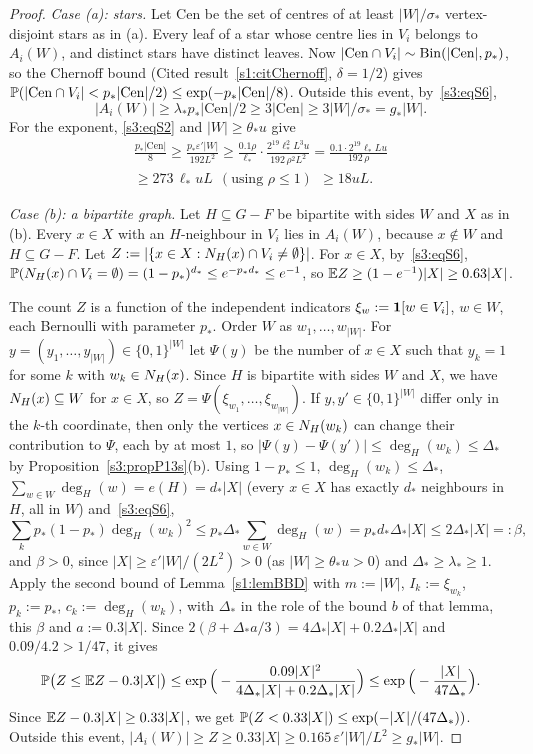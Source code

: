 \begin{proof}
\emph{Case (a): stars.} Let $\mathrm{Cen}$ be the set of centres of at
least $|W|/\sigma_*$ vertex-disjoint stars as in (a). Every leaf of a
star whose centre lies in $V_i$ belongs to $A_i(W)$, and distinct stars
have distinct leaves. Now $|\mathrm{Cen}\cap V_i|\sim\mathrm{Bin}(|\mathrm{Cen}|,p_*)$,
so the Chernoff bound (Cited result~\ref{s1:citChernoff}, $\delta=1/2$) gives
$\mathbb{P}(|\mathrm{Cen}\cap V_i|<p_*|\mathrm{Cen}|/2)\le\exp(-p_*|\mathrm{Cen}|/8)$.
Outside this event, by~\ref{s3:eqS6},
\[
|A_i(W)|\ge\lambda_*p_*|\mathrm{Cen}|/2\ge3|\mathrm{Cen}|\ge3|W|/\sigma_*=g_*|W|.
\]
For the exponent, \ref{s3:eqS2} and $|W|\ge\theta_*u$ give
\begin{multline*}
\frac{p_*|\mathrm{Cen}|}{8}\ge\frac{p_*\varepsilon'|W|}{192L^2}\ge\frac{0.1\rho}{\ell_*}\cdot\frac{2^{19}\ell_*^2L^3u}{192\,\rho^2L^2}=\frac{0.1\cdot2^{19}\ell_*Lu}{192\,\rho}\\
\ge 273\,\ell_*uL\ \ (\text{using }\rho\le1)\ \ \ge 18uL.
\end{multline*}

\emph{Case (b): a bipartite graph.} Let $H\subseteq G-F$ be bipartite
with sides $W$ and $X$ as in (b). Every $x\in X$ with an $H$-neighbour in
$V_i$ lies in $A_i(W)$, because $x\notin W$ and $H\subseteq G-F$. Let
$Z:=|\{x\in X:N_H(x)\cap V_i\ne\emptyset\}|$. For $x\in X$,
by~\ref{s3:eqS6},
$\mathbb{P}(N_H(x)\cap V_i=\emptyset)=(1-p_*)^{d_*}\le e^{-p_*d_*}\le e^{-1}$,
so $\mathbb{E} Z\ge(1-e^{-1})|X|\ge0.63|X|$.

The count $Z$ is a function of the independent indicators
$\xi_w:=\mathbf{1}[w\in V_i]$, $w\in W$, each Bernoulli with parameter $p_*$.
Order $W$ as $w_1,\dots,w_{|W|}$. For $y=(y_1,\dots,y_{|W|})\in\{0,1\}^{|W|}$
let $\Psi(y)$ be the number of $x\in X$ such that $y_k=1$ for some $k$ with
$w_k\in N_H(x)$. Since $H$ is bipartite with sides $W$ and $X$, we have
$N_H(x)\subseteq W$ for $x\in X$, so
$Z=\Psi(\xi_{w_1},\dots,\xi_{w_{|W|}})$. If $y,y'\in\{0,1\}^{|W|}$ differ
only in the $k$-th coordinate, then only the vertices $x\in N_H(w_k)$ can
change their contribution to $\Psi$, each by at most $1$, so
$|\Psi(y)-\Psi(y')|\le\deg_H(w_k)\le\Delta_*$ by
Proposition~\ref{s3:propP13s}(b). Using $1-p_*\le1$,
$\deg_H(w_k)\le\Delta_*$, $\sum_{w\in W}\deg_H(w)=e(H)=d_*|X|$ (every
$x\in X$ has exactly $d_*$ neighbours in $H$, all in $W$) and~\ref{s3:eqS6},
\[
\sum_k p_*(1-p_*)\deg_H(w_k)^2\le p_*\Delta_*\sum_{w\in W}\deg_H(w)=p_*d_*\Delta_*|X|\le 2\Delta_*|X|=:\beta ,
\]
and $\beta>0$, since $|X|\ge\varepsilon'|W|/(2L^2)>0$ (as $|W|\ge\theta_*u>0$)
and $\Delta_*\ge\lambda_*\ge1$.
Apply the second bound of Lemma~\ref{s1:lemBBD} with $m:=|W|$,
$I_k:=\xi_{w_k}$, $p_k:=p_*$, $c_k:=\deg_H(w_k)$, with $\Delta_*$ in the role
of the bound $b$ of that lemma, this $\beta$ and $a:=0.3|X|$. Since
$2(\beta+\Delta_*a/3)=4\Delta_*|X|+0.2\Delta_*|X|$ and
$0.09/4.2>1/47$, it gives
\[
\mathbb{P}\big(Z\le\mathbb{E} Z-0.3|X|\big)\le\exp\Big(-\frac{0.09|X|^2}{4\Delta_*|X|+0.2\Delta_*|X|}\Big)\le\exp\Big(-\frac{|X|}{47\Delta_*}\Big).
\]
Since $\mathbb{E} Z-0.3|X|\ge0.33|X|$, we get
$\mathbb{P}(Z<0.33|X|)\le\exp(-|X|/(47\Delta_*))$. Outside this event,
$|A_i(W)|\ge Z\ge0.33|X|\ge0.165\,\varepsilon'|W|/L^2\ge g_*|W|$.


\end{proof}
